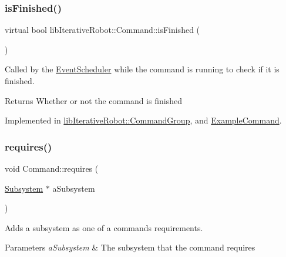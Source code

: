 \subsubsection{\texorpdfstring{isFinished()}{isFinished()}}
{\footnotesize\ttfamily virtual bool lib\+Iterative\+Robot\+::\+Command\+::is\+Finished (\begin{DoxyParamCaption}{ }\end{DoxyParamCaption})\hspace{0.3cm}{\ttfamily [pure virtual]}}



Called by the \mbox{\hyperlink{classlib_iterative_robot_1_1_event_scheduler}{Event\+Scheduler}} while the command is running to check if it is finished. 

\begin{DoxyReturn}{Returns}
Whether or not the command is finished 
\end{DoxyReturn}


Implemented in \mbox{\hyperlink{classlib_iterative_robot_1_1_command_group_a96807a2763adf9e21ebf2cb9e3574e3c}{lib\+Iterative\+Robot\+::\+Command\+Group}}, and \mbox{\hyperlink{class_example_command_ab4e52d526bda7fe22705b2d3c44286e0}{Example\+Command}}.

\mbox{\label{classlib_iterative_robot_1_1_command_ad7b7f328974f5f17a2a4b1593b6c9eb5}} 
\subsubsection{\texorpdfstring{requires()}{requires()}}
{\footnotesize\ttfamily void Command\+::requires (\begin{DoxyParamCaption}\item[{\mbox{\hyperlink{classlib_iterative_robot_1_1_subsystem}{Subsystem}} $\ast$}]{a\+Subsystem }\end{DoxyParamCaption})\hspace{0.3cm}{\ttfamily [protected]}}



Adds a subsystem as one of a command\textquotesingle{}s requirements. 


\begin{DoxyParams}{Parameters}
{\em a\+Subsystem} & The subsystem that the command requires \\
\hline
\end{DoxyParams}


